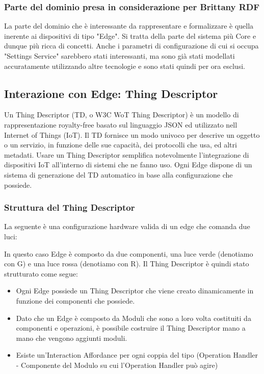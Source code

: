 
\subsubsection{Parte del dominio presa in considerazione per Brittany RDF}
\noindent La parte del dominio che è interessante da rappresentare e formalizzare è quella inerente ai dispositivi di tipo "Edge". Si tratta della parte del sistema più Core e dunque più ricca di concetti. \newline
Anche i parametri di configurazione di cui si occupa "Settings Service" sarebbero stati interessanti, ma sono già stati modellati accuratamente utilizzando altre tecnologie e sono stati quindi per ora esclusi.


\subsection{Interazione con Edge: Thing Descriptor}
Un Thing Descriptor (TD, o W3C WoT Thing Descriptor) è un modello di rappresentazione royalty-free basato sul linguaggio JSON ed utilizzato nell Internet of Things (IoT). Il TD fornisce un modo univoco per descrive un oggetto o un servizio, in funzione delle sue capacità, dei protocolli che usa, ed altri metadati. Usare un Thing Descriptor semplifica notevolmente l’integrazione di dispositivi IoT all’interno di sistemi che ne fanno uso. Ogni Edge dispone di un sistema di generazione del TD automatico in base alla configurazione che possiede.

\subsubsection{Struttura del Thing Descriptor}
La seguente è una configurazione hardware valida di un edge che comanda due luci:

\noindent In questo caso Edge è composto da due componenti, una luce verde (denotiamo con G) e una luce rossa (denotiamo con R). Il Thing Descriptor è quindi stato strutturato come segue:
\begin{itemize}
	\item Ogni Edge possiede un Thing Descriptor che viene creato dinamicamente in funzione dei componenti che possiede.
	\item Dato che un Edge è composto da Moduli che sono a loro volta costituiti da componenti e operazioni, è possibile costruire il Thing Descriptor mano a mano che vengono aggiunti moduli.
	\item Esiste un'Interaction Affordance per ogni coppia del tipo (Operation Handler - Componente del Modulo su cui l'Operation Handler può agire)
\end{itemize}


